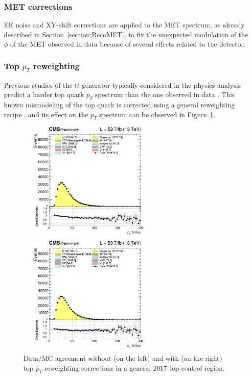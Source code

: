 \documentclass[a4paper, 10pt, openright]{report}
\begin{document}
\subsubsection{\ac{MET} corrections}

EE noise and XY-shift corrections are applied to the \ac{MET} spectrum, as already described in Section~\ref{section:RecoMET}, to fix the unexpected modulation of the $\phi$ of the \ac{MET} observed in data because of several effects related to the detector.

\subsubsection{Top $p_T$ reweighting} \label{subsection:toppt}

Previous studies of the $t \bar t$ generator typically considered in the physics analysis predict a harder top quark $p_T$ spectrum than the one observed in data \cite{topPt}. This known mismodeling of the top quark is corrected using a general reweighting recipe \cite{TopPtRecipe}, and its effect on the $p_T$ spectrum can be observed in Figure~\ref{fig:Toppt}.

\begin{figure}[htbp]
\begin{center}
\begin{minipage}[b]{.48\textwidth}
\includegraphics[width=7cm, height=6cm]{figs/cratio_topCR_df_2j_pt1_without.png}
\end{minipage} \hfill
\begin{minipage}[b]{.48\textwidth}
\includegraphics[width=7cm, height=6cm]{figs/cratio_topCR_df_2j_pt1_with.png}
\end{minipage} \hfill
\caption{Data/\ac{MC} agreement without (on the left) and with (on the right) top $p_T$ reweighting corrections in a general 2017 top control region.}
\label{fig:Toppt}
\end{center}
\end{figure}
\end{document}
